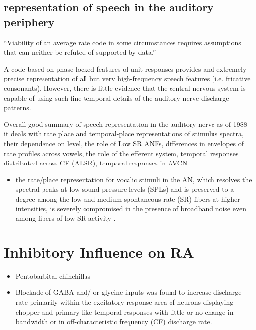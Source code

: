 \documentclass[10pt,a4paper]{article}
\begin{document}
\subsection{\citep{SachsWinslowEtAl:1988} representation of speech in the auditory periphery}

{\textquotedblleft}Viability of an average rate code in some circumstances
requires assumptions that can neither be refuted of supported by
data.{\textquotedblright}

A code based on phase-locked features of unit responses provides and extremely
precise representation of all but very high-frequency speech features
(i.e. fricative consonants).  However, there is little evidence that the central
nervous system is capable of using such fine temporal details of the auditory
nerve discharge patterns.

Overall good summary of speech representation in the auditory nerve as of 1988--
it deals with rate place and temporal-place representations of stimulus spectra,
their dependence on level, the role of Low SR ANFs, differences in envelopes of
rate profiles across vowels, the role of the efferent system, temporal responses
distributed across CF (ALSR), temporal responses in AVCN.

\citep{Geisler:1988}

\citep{RhodeGreenberg:1994a}


\begin{itemize}
\item the rate/place representation for vocalic stimuli in the AN, which
  resolves the spectral peaks at low sound pressure levels (SPLs) and is
  preserved to a degree among the low and medium spontaneous rate (SR) fibers at
  higher intensities, is severely compromised in the presence of broadband noise
  \citep{GeislerGamble:1989,SachsVoigtEtAl:1983} even among fibers of low SR
  activity \citep{SachsVoigtEtAl:1983,SilkesGeisler:1991}.
\end{itemize}

\section{Inhibitory Influence on RA}
\citep{CasparyBackoffEtAl:1994}


\begin{itemize}
\item Pentobarbital chinchillas
\item Blockade of GABA and/ or glycine inputs was found to increase discharge
  rate primarily within the excitatory response area of neurons displaying
  chopper and primary-like temporal responses with little or no change in
  bandwidth or in off-characteristic frequency (CF) discharge rate.
\end{itemize}
\end{document}

